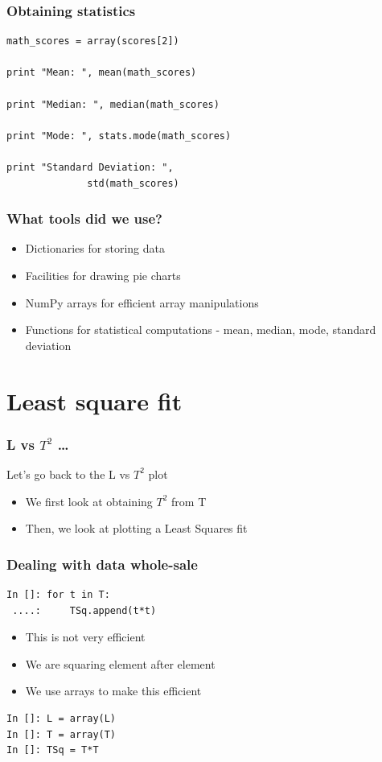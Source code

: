 \documentclass[14pt,compress]{beamer}
\newcounter{time}
\newcommand{\inctime}[1]{\addtocounter{time}{#1}{\tiny \thetime\ m}}
\begin{document}
\begin{frame}[fragile]
  \frametitle{Obtaining statistics}
  \begin{lstlisting}
math_scores = array(scores[2])

print "Mean: ", mean(math_scores)

print "Median: ", median(math_scores)

print "Mode: ", stats.mode(math_scores)

print "Standard Deviation: ",
              std(math_scores)
  \end{lstlisting}
  \inctime{15}
\end{frame}

\begin{frame}[fragile]
  \frametitle{What tools did we use?}
  \begin{itemize}
   \item Dictionaries for storing data
   \item Facilities for drawing pie charts
   \item NumPy arrays for efficient array manipulations
   \item Functions for statistical computations - mean, median, mode, standard deviation
  \end{itemize}
\end{frame}

\section{Least square fit}
\begin{frame}
\frametitle{L vs $T^2$ \ldots}
Let's go back to the L vs $T^2$ plot
\begin{itemize}
\item We first look at obtaining $T^2$ from T
\item Then, we look at plotting a Least Squares fit
\end{itemize}
\end{frame}

\begin{frame}[fragile]
\frametitle{Dealing with data whole-sale}
\begin{lstlisting}
In []: for t in T:
 ....:     TSq.append(t*t)
\end{lstlisting}
\begin{itemize}
\item This is not very efficient
\item We are squaring element after element
\item We use arrays to make this efficient
\end{itemize}
\begin{lstlisting}
In []: L = array(L)
In []: T = array(T)
In []: TSq = T*T
\end{lstlisting}
\end{frame}
\end{document}

